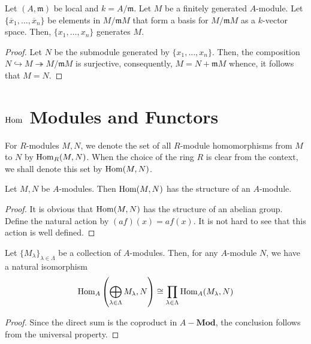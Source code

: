 \begin{lemma}
    Let $(A,\mathfrak m)$ be local and $k = A/\mathfrak m$. Let $M$ be a finitely generated $A$-module. Let $\{\overline x_1,\ldots,\overline x_n\}$ be elements in $M/\mathfrak mM$ that form a basis for $M/\mathfrak mM$ as a $k$-vector space. Then, $\{x_1,\ldots,x_n\}$ generates $M$.
\end{lemma}
\begin{proof}
    Let $N$ be the submodule generated by $\{x_1,\ldots,x_n\}$. Then, the composition $N\hookrightarrow M\twoheadrightarrow M/\mathfrak mM$ is surjective, consequently, $M = N + \mathfrak mM$ whence, it follows that $M = N$.
\end{proof}

\section{\texorpdfstring{$\operatorname{Hom}$}{} Modules and Functors}

For $R$-modules $M,N$, we denote the set of all $R$-module homomorphisms from $M$ to $N$ by $\operatorname{Hom}_R(M,N)$. When the choice of the ring $R$ is clear from the context, we shall denote this set by $\operatorname{Hom}(M,N)$.

\begin{proposition}
    Let $M,N$ be $A$-modules. Then $\operatorname{Hom}(M,N)$ has the structure of an $A$-module.
\end{proposition}
\begin{proof}
    It is obvious that $\operatorname{Hom}(M,N)$ has the structure of an abelian group. Define the natural action by $(af)(x) = af(x)$. It is not hard to see that this action is well defined.
\end{proof}

\begin{proposition}
    Let $\{M_\lambda\}_{\lambda\in\Lambda}$ be a collection of $A$-modules. Then, for any $A$-module $N$, we have a natural isomorphism
    \begin{equation*}
        \operatorname{Hom}_A\left(\bigoplus_{\lambda\in\Lambda}M_\lambda, N\right)\cong\prod_{\lambda\in\Lambda}\operatorname{Hom}_A(M_\lambda,N)
    \end{equation*}
\end{proposition}
\begin{proof}
    Since the direct sum is the coproduct in $A-\mathbf{Mod}$, the conclusion follows from the universal property.
\end{proof}

